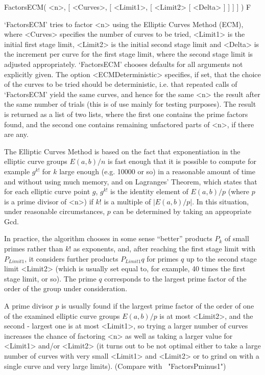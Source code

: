 \>FactorsECM( <n>, [ <Curves>, [ <Limit1>, [ <Limit2> [ <Delta> ] ] ] ] ) F

`FactorsECM' tries to factor <n> using the Elliptic Curves Method (ECM),
where <Curves> specifies the number of curves to be tried,
<Limit1> is the initial
first stage limit,
<Limit2> is the initial
second stage limit and
<Delta> is the increment per curve for the first stage limit, where
the second stage limit is adjusted appropriately. 
`FactorsECM' chooses defaults for all arguments not explicitly given.
The option <ECMDeterministic> specifies,
if set, that the choice of the curves to be tried should be 
deterministic, i.e. that repeated calls of `FactorsECM' yield 
the same curves, and hence for the same <n> the result after the same
number of trials (this is of use mainly for testing purposes).
The result is returned as a list of two lists, where the first one 
contains the prime factors found, and the second one contains
remaining unfactored parts of <n>, if there are any.

The Elliptic Curves Method is based on the fact that exponentiation
in the
elliptic curve groups 
$E(a,b)/n$ is fast enough
that it is possible to compute for example $g^{k!}$ for $k$ large enough 
(e.g. 10000 or so) in a reasonable amount of time and without
using much memory, and on Lagranges' Theorem, 
which states that for each
elliptic curve point $g$,
$g^{k!}$ is the identity element of $E(a,b)/p$ (where $p$ is a prime
divisor of <n>) if $k!$ is a multiple of $|E(a,b)/p|$.
In this situation, under reasonable circumstances, $p$ can be
determined by taking an appropriate Gcd.

In practice, the algorithm chooses in some sense ``better''
products $P_k$ of small primes rather than $k!$ as exponents, and,
after reaching the first stage limit with $P_{Limit1}$, it
considers further products $P_{Limit1}q$ for primes $q$ up to
the second stage limit <Limit2> (which is usually set equal to, 
for example, 40 times the first stage limit, or so).
The prime $q$ corresponds to the largest prime factor of the
order of the group under consideration.

A prime divisor $p$ is usually found if the largest prime factor
of the order of one of the examined elliptic curve groups $E(a,b)/p$ 
is at most <Limit2>, and the second - largest one is at most <Limit1>,
so trying a larger number of curves increases the chance of
factoring <n> as well as taking a larger value
for <Limit1> and/or <Limit2> (it turns out to be not optimal either to
take a large number of curves with very small <Limit1> and <Limit2> 
or to grind on with a single curve and very large limits).
(Compare with ~"FactorsPminus1")

